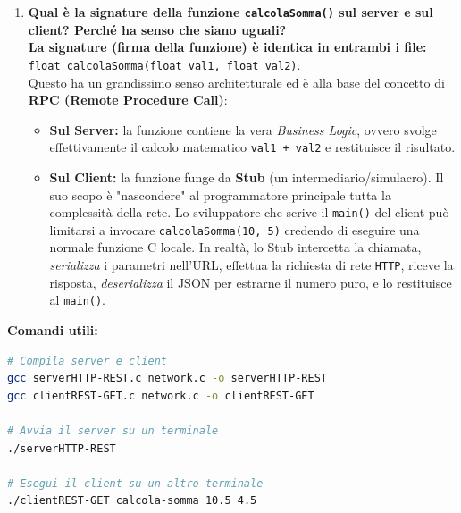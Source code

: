 \documentclass[11pt]{article}
\begin{document}
\begin{tcolorbox}[colback=green!5!white,colframe=green!75!black,title=\textbf{RISPOSTA}, breakable]
\begin{enumerate}
    \item \textbf{Qual è la signature della funzione \texttt{calcolaSomma()} sul server e sul client? Perché ha senso che siano uguali?}\\
    \textbf{La signature (firma della funzione) è identica in entrambi i file:} \texttt{float calcolaSomma(float val1, float val2)}.\\
    Questo ha un grandissimo senso architetturale ed è alla base del concetto di \textbf{RPC (Remote Procedure Call)}:
    \begin{itemize}
        \item \textbf{Sul Server:} la funzione contiene la vera \textit{Business Logic}, ovvero svolge effettivamente il calcolo matematico \texttt{val1 + val2} e restituisce il risultato.
        \item \textbf{Sul Client:} la funzione funge da \textbf{Stub} (un intermediario/simulacro). Il suo scopo è "nascondere" al programmatore principale tutta la complessità della rete. Lo sviluppatore che scrive il \texttt{main()} del client può limitarsi a invocare \texttt{calcolaSomma(10, 5)} credendo di eseguire una normale funzione C locale. In realtà, lo Stub intercetta la chiamata, \textit{serializza} i parametri nell'URL, effettua la richiesta di rete \texttt{HTTP}, riceve la risposta, \textit{deserializza} il JSON per estrarne il numero puro, e lo restituisce al \texttt{main()}.
    \end{itemize}
\end{enumerate}

\textbf{Comandi utili:}
\begin{lstlisting}[language=bash, basicstyle=\ttfamily\small]
# Compila server e client
gcc serverHTTP-REST.c network.c -o serverHTTP-REST
gcc clientREST-GET.c network.c -o clientREST-GET

# Avvia il server su un terminale
./serverHTTP-REST

# Esegui il client su un altro terminale
./clientREST-GET calcola-somma 10.5 4.5
\end{lstlisting}
\end{tcolorbox}
\end{document}
